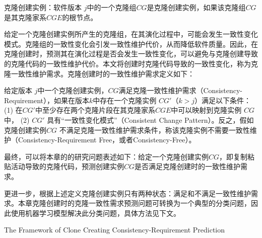 \begin{definition}
\label{def-creatinginstance}
克隆创建实例：软件版本 $j$中的一个克隆组$CG$是克隆创建实例，如果该克隆组$CG$是其克隆家系$CGE$的根节点。
\end{definition}



给定一个克隆创建实例所产生的克隆组，在其演化过程中，可能会发生一致性变化模式。克隆组的一致性变化会引发一致性维护代价，从而降低软件质量。因此，在克隆创建时，预测其在演化过程是否会发生一致性变化，可以避免与克隆创建导致的克隆代码的一致性维护代价。本文将创建时克隆代码导致的一致性变化，称为克隆一致性维护需求。克隆创建时的一致性维护需求定义如下：\\

\begin{definition}
 \label{def-creatingrequirement}
给定版本 $j$中一个克隆创建实例，$CG$满足克隆一致性维护需求（Consistency-Requirement），如果在版本$k$中存在一个克隆实例 $CG'$（$k>j$）满足以下条件： (1) 在$CG'$中至少存在两个克隆片段在其克隆家系$CGE$中可以映射到克隆实例 $CG$中， (2) $CG'$ 具有“一致性变化模式”（Consistent Change Pattern）。反之，假如克隆创建实例$CG$ 不满足克隆一致性维护需求条件，称该克隆实例不需要一致性维护（Consistency-Requirement Free，或者Consistency-Free）。
\end{definition}


最终，可以将本章的的研究问题表述如下：给定一个克隆创建实例$CG$，即复制粘贴活动导致的克隆代码，预测创建实例$CG$是否满足克隆创建时的一致性维护需求。

更进一步，根据上述定义克隆创建实例只有两种状态：满足和不满足一致性维护需求。本章克隆创建时的克隆一致性需求预测问题可转换为一个典型的分类问题，因此使用机器学习模型解决此分类问题，具体方法见下文。

{The Framework of Clone Creating Consistency-Requirement Prediction }

